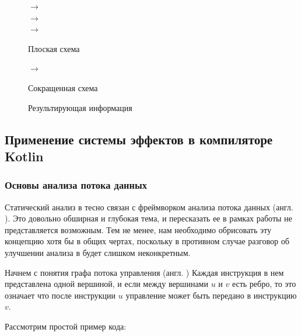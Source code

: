 \begin{figure}[h]
  {
     $\rightarrow$  \\

      $\rightarrow$  \\

     $\rightarrow$ 
  }
  {}

  \caption{Плоская схема}
  \label{fig:flat-schema}
\end{figure}

\begin{figure}[h]
  {
     $\rightarrow$ 
  }
  {}

  \caption{Сокращенная схема}
  \label{fig:reduced-schema}
\end{figure}

\begin{figure}[h]

  \caption{Результирующая информация}
  \label{fig:info-holder}
\end{figure}

\newpage

\subsection{Применение системы эффектов в компиляторе Kotlin}

\subsubsection{Основы анализа потока данных}

Статический анализ в  тесно связан с фреймворком анализа потока данных (англ. ). Это довольно обширная и глубокая тема, и пересказать ее в рамках работы не представляется возможным. Тем не менее, нам необходимо обрисовать эту концепцию хотя бы в общих чертах, поскольку в противном случае разговор об улучшении анализа в  будет слишком неконкретным.

Начнем с понятия графа потока управления (англ. ) Каждая инструкция в нем представлена одной вершиной, и если между вершинами $u$ и $v$ есть ребро, то это означает что после инструкции $u$ управление может быть передано
в инструкцию $v$.

Рассмотрим простой пример кода:

